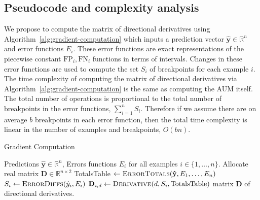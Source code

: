 \documentclass{article}
\begin{document}

\subsection{Pseudocode and complexity analysis}
We propose to compute 
the matrix of directional derivatives using Algorithm~\ref{alg:gradient-computation} which inputs a prediction vector $\mathbf {\hat y}\in\mathbb R^n$ and error functions $E_i$.
These error functions are exact representations of the piecewise constant $\text{FP}_i, \text{FN}_i$ functions in terms of intervals.
Changes in these error functions are used to compute the set $S_i$ of breakpoints for each example $i$.
The time complexity of computing the matrix of directional derivatives via Algorithm~\ref{alg:gradient-computation} is the same as computing the AUM itself.
The total number of operations is proportional to the total number of breakpoints in the error functions, $\sum_{i=1}^n S_i$.
Therefore if we assume there are on average $b$ breakpoints in each error function, then the total time complexity is linear in the number of examples and breakpoints, $O(bn)$.


\begin{algorithm}[tb]
   \caption{Gradient Computation}
   \label{alg:gradient-computation}
\begin{algorithmic}
   Predictions $\mathbf{\hat y}\in\mathbb R^n$, 
   Errors functions $E_i$ for all examples $i\in\{1,\dots,n\}$.
   \STATE Allocate real matrix $\mathbf D\in\mathbb R^{n\times 2}$
   \STATE TotalsTable $\gets \textsc{ErrorTotals}(\mathbf{\hat y}, E_1, \dots, E_n)$
   \STATE $S_i \gets \textsc{ErrorDiffs}(\hat y_i, E_i)$
   \STATE $\mathbf D_{i,d}\gets \textsc{Derivative}(d, S_i, \text{TotalsTable})$
   \ENDFOR
   \ENDFOR
    matrix $\mathbf D$ of directional derivatives.
\end{algorithmic}
\end{algorithm}
\end{document}

